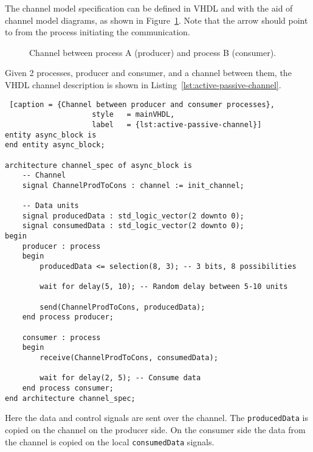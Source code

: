 \documentclass{report}
\begin{document}
The channel model specification can be defined in VHDL and with the aid of
channel model diagrams, as shown in
Figure~\ref{fig:passive-active-channels}. Note that the arrow should point to
from the process initiating the communication.

\begin{figure}[H]
\centering
{}
\caption{Channel between process A (producer) and process B (consumer).}\label{fig:passive-active-channels}
\end{figure}

Given 2 processes, producer and consumer, and a channel between them, the VHDL
channel description is shown in Listing~\ref{lst:active-passive-channel}.

\begin{lstlisting} [caption = {Channel between producer and consumer processes},
                    style   = mainVHDL,
                    label   = {lst:active-passive-channel}]
entity async_block is
end entity async_block;

architecture channel_spec of async_block is
    -- Channel
    signal ChannelProdToCons : channel := init_channel;

    -- Data units
    signal producedData : std_logic_vector(2 downto 0);
    signal consumedData : std_logic_vector(2 downto 0);
begin
    producer : process
    begin
        producedData <= selection(8, 3); -- 3 bits, 8 possibilities

        wait for delay(5, 10); -- Random delay between 5-10 units

        send(ChannelProdToCons, producedData);
    end process producer;

    consumer : process
    begin
        receive(ChannelProdToCons, consumedData);

        wait for delay(2, 5); -- Consume data
    end process consumer;
end architecture channel_spec;
\end{lstlisting}

Here the data and control signals are sent over the channel. The
\lstinline{producedData} is copied on the channel on the producer side. On the
consumer side the data from the channel is copied on the local
\lstinline{consumedData} signals.
\end{document}
